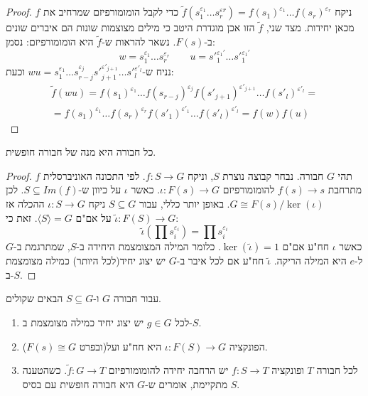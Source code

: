 \documentclass{tstextbook}
\begin{document}
\begin{proof}
ניקח \(\tilde{f}\left( s_{1}^{\varepsilon_{1}}\dots s_{r}^{\varepsilon r} \right)=f(s_{1})^{\varepsilon_{1}}\dots f(s_{r})^{\varepsilon_{r}}\) כדי לקבל הומומורפיזם שמרחיב את \(f\) מכאן יחידות. מצד שני, \(\tilde{f}\) הזו
אכן מוגדרת היטב כי מילים מצוצמות שונות הם איברים שונים ב-\(F(s)\). נשאר להראות ש-\(\tilde{f}\) היא הומומורפיזם: נסמן:
$$w=s_{1}^{\varepsilon_{1}}\dots s_{r}^{\varepsilon_{r}} \qquad u={s'}_{1}^{\varepsilon_{1}'}\dots {s'}_{1}^{\varepsilon_{1}'}$$
נניח ש-\(wu=s_{1}^{\varepsilon_{1}}\dots s_{r-j}^{\varepsilon_j}{s'}_{{j+1}}^{\varepsilon'_{j+1}}\dots {s'}_{l}^{\varepsilon'_{l}}\) וכעת: 
$$\begin{gathered}\tilde{f}(wu)=f(s_{1})^{\varepsilon_{1}}\dots f(s_{r-j})^{\varepsilon_{j}} f({s'}_{j+1})^{\varepsilon'_{j+1}}\dots f({s'}_{l})^{\varepsilon'_{l}}= \\=f(s_{1})^{\varepsilon_{1}}\dots f(s_{r})^{\varepsilon_{r} }f({s'}_{1})^{\varepsilon'_{1}}\dots f({s'}_{l})^{\varepsilon'_{l}}=f(w)f(u)
\end{gathered}$$

\end{proof}
\begin{proposition}
כל חבורה היא מנה של חבורה חופשית.

\end{proposition}
\begin{proof}
תהי \(G\) חבורה. נבחר קבוצה נוצרת \(S\), וניקח \(f:S\to G\). לפי התכונה האוניברסלית \(f\) מתרחבת \(f(s)\to s\) להומומורפיזם \(\iota:F(s)\to G\). כאשר \(\iota\) על כיוון ש-\(S\subseteq Im(f)\). לכן \(G\cong F(s) / \ker\left( \iota \right)\). באופן יותר כללי, עבור \(S\subseteq G\) ניקח \(\iota:S\to G\) ההכלה אז \(\tilde{\iota}:F(S)\to G\) על אם"ם \(\langle S\rangle=G\). זאת כי:
$$\tilde{\iota}\left( \prod s_{i}^{\varepsilon_{i}} \right)=\prod s_{i}^{\varepsilon_{i}}$$
כאשר \(\iota\) חח"ע אם"ם \(\ker\left( \tilde{\iota} \right)=1\). כלומר המילה המצומצמת היחידה ב-\(S\), שמתרגמת ב-\(G\) ל-\(e\) היא המילה הריקה. \(\tilde{\iota}\) חח"ע אם לכל איבר ב-\(G\) יש יצוג יחיד(לכל היותר) כמילה מצומצמת ב-\(S\).

\end{proof}
\begin{proposition}
עבור חבורה \(G\) ו-\(S\subseteq G\) הבאים שקולים.

  \begin{enumerate}
    \item לכל \(g\in G\) יש יצוג יחיד כמילה מצומצמת ב-\(S\). 


    \item הפונקציה \(\iota:F(S)\to G\) היא חח"ע ועל(ובפרט \(F(s)\cong G\)). 


    \item לכל חבורה \(T\) ופונקציה \(f:S\to T\) יש הרחבה יחידה להומומורפיזם  \(\tilde{f}:G\to T\). 
כשהטענה מתקיימת, אומרים ש-\(G\) היא חבורה חופשית עם בסיס \(S\).


  \end{enumerate}
\end{proposition}
\end{document}

